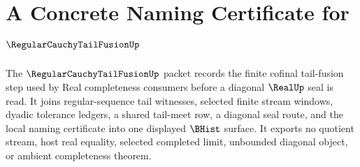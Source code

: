 \chapter{A Concrete Naming Certificate for $\RegularCauchyTailFusionUp$}
\label{ch:concrete-instances-regularcauchytailfusion-namecert}

The $\RegularCauchyTailFusionUp$ packet records the finite cofinal tail-fusion step used by Real completeness consumers before a diagonal $\RealUp$ seal is read. It joins regular-sequence tail witnesses, selected finite stream windows, dyadic tolerance ledgers, a shared tail-meet row, a diagonal seal route, and the local naming certificate into one displayed $\BHist$ surface. It exports no quotient stream, host real equality, selected completed limit, unbounded diagonal object, or ambient completeness theorem.




